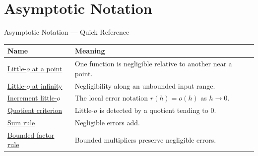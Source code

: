 \section{Asymptotic Notation}

\begin{toolkitbox}{Asymptotic Notation --- Quick Reference}
\small
\begin{tabular}{l l}
\toprule
\textbf{Name} & \textbf{Meaning}\\
\midrule
\hyperref[def:little-o-at-a-point]{Little-$o$ at a point} & One function is negligible relative to another near a point.\\
\hyperref[def:little-o-at-infinity]{Little-$o$ at infinity} & Negligibility along an unbounded input range.\\
\hyperref[def:increment-little-o]{Increment little-$o$} & The local error notation $r(h)=o(h)$ as $h\to0$.\\
\hyperref[prop:little-o-quotient-characterization]{Quotient criterion} & Little-$o$ is detected by a quotient tending to $0$.\\
\hyperref[prop:little-o-sum-rule]{Sum rule} & Negligible errors add.\\
\hyperref[prop:little-o-bounded-factor-rule]{Bounded factor rule} & Bounded multipliers preserve negligible errors.\\
\bottomrule
\end{tabular}
\end{toolkitbox}


